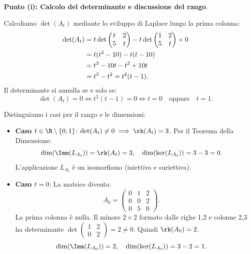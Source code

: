 \begin{dimostrazione}
\textbf{Punto (i): Calcolo del determinante e discussione del rango}.

Calcoliamo $\det(A_t)$ mediante lo sviluppo di Laplace lungo la prima colonna:
\begin{align}
    \det(A_t) &= t \det \begin{pmatrix} t & 2 \\ 5 & t \end{pmatrix} - t \det \begin{pmatrix} 1 & 2 \\ 5 & t \end{pmatrix} + 0 \notag \\
    &= t(t^2 - 10) - t(t - 10) \notag \\
    &= t^3 - 10t - t^2 + 10t \notag \\
    &= t^3 - t^2 = t^2(t - 1).
\end{align}
Il determinante si annulla se e solo se:
\begin{equation}
    \det(A_t) = 0 \iff t^2(t - 1) = 0 \iff t = 0 \quad \text{oppure} \quad t = 1.
\end{equation}

Distinguiamo i casi per il rango e le dimensioni:
\begin{itemize}
    \item \textbf{Caso $t \in \R \setminus \{0, 1\}$}: $\det(A_t) \neq 0 \implies \rk(A_t) = 3$.
    Per il Teorema della Dimensione:
    \begin{equation}
        \dim(\Imm(L_{A_t})) = \rk(A_t) = 3, \quad \dim(\ker(L_{A_t})) = 3 - 3 = 0.
    \end{equation}
    L'applicazione $L_{A_t}$ è un isomorfismo (iniettiva e suriettiva).

    \item \textbf{Caso $t = 0$}: La matrice diventa:
    \begin{equation}
        A_0 = \begin{pmatrix} 0 & 1 & 2 \\ 0 & 0 & 2 \\ 0 & 5 & 0 \end{pmatrix}.
    \end{equation}
    La prima colonna è nulla. Il minore $2 \times 2$ formato dalle righe 1,2 e colonne 2,3 ha determinante $\det \begin{pmatrix} 1 & 2 \\ 0 & 2 \end{pmatrix} = 2 \neq 0$.
    Quindi $\rk(A_0) = 2$.
    \begin{equation}
        \dim(\Imm(L_{A_0})) = 2, \quad \dim(\ker(L_{A_0})) = 3 - 2 = 1.
    \end{equation}


\end{itemize}
\end{dimostrazione}
